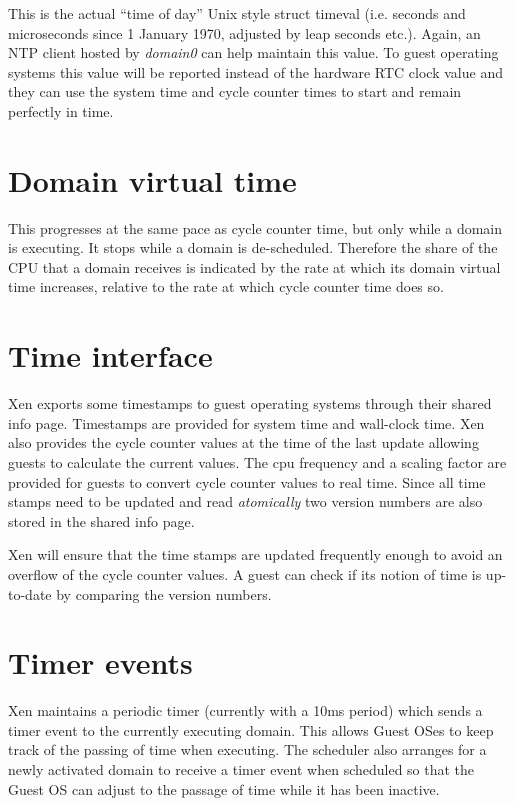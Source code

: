 \documentclass[11pt,twoside,final,openright]{xenstyle}
\begin{document}
This is the actual ``time of day'' Unix style struct timeval (i.e. seconds and
microseconds since 1 January 1970, adjusted by leap seconds etc.).  Again, an 
NTP client hosted by {\it domain0} can help maintain this value.  To guest 
operating systems this value will be reported instead of the hardware RTC
clock value and they can use the system time and cycle counter times to start
and remain perfectly in time.

\section{Domain virtual time}

This progresses at the same pace as cycle counter time, but only while a
domain is executing.  It stops while a domain is de-scheduled.  Therefore the
share of the CPU that a domain receives is indicated by the rate at which
its domain virtual time increases, relative to the rate at which cycle
counter time does so.

\section{Time interface}

Xen exports some timestamps to guest operating systems through their shared
info page.  Timestamps are provided for system time and wall-clock time.  Xen
also provides the cycle counter values at the time of the last update
allowing guests to calculate the current values.  The cpu frequency and a
scaling factor are provided for guests to convert cycle counter values to
real time.  Since all time stamps need to be updated and read
\emph{atomically} two version numbers are also stored in the shared info
page.

Xen will ensure that the time stamps are updated frequently enough to avoid
an overflow of the cycle counter values.  A guest can check if its notion of
time is up-to-date by comparing the version numbers.

\section{Timer events}

Xen maintains a periodic timer (currently with a 10ms period) which sends a
timer event to the currently executing domain.  This allows Guest OSes to
keep track of the passing of time when executing.  The scheduler also
arranges for a newly activated domain to receive a timer event when
scheduled so that the Guest OS can adjust to the passage of time while it
has been inactive.
\end{document}

